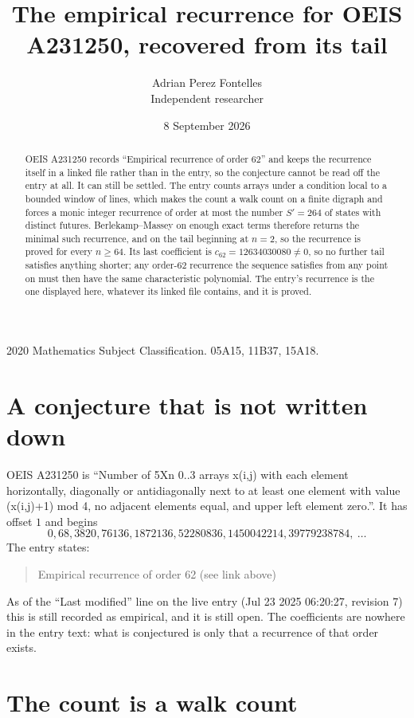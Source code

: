 \documentclass[11pt,a4paper]{article}
\title{The empirical recurrence for OEIS A231250, recovered from its tail}
\author{Adrian Perez Fontelles\\ \small Independent researcher}
\date{8 September 2026}
\theoremstyle{plain}
\theoremstyle{definition}
\begin{document}
\maketitle

\begin{abstract}
OEIS A231250 records ``Empirical recurrence of order $62$'' and keeps the recurrence itself in
a linked file rather than in the entry, so the conjecture cannot be read off the entry at all.
It can still be settled. The entry counts arrays under a condition local to a bounded window of
lines, which makes the count a walk count on a finite digraph and forces a monic integer
recurrence of order at most the number $S'=264$ of states with distinct futures. Berlekamp--Massey on
enough exact terms therefore returns the minimal such recurrence, and on the tail beginning at $n=2$, so the recurrence is proved for every $n\ge64$.
Its last coefficient is $c_{62}=12634030080\neq0$, so no further tail satisfies anything
shorter; any order-$62$ recurrence the sequence satisfies from any point on must then have
the same characteristic polynomial. The entry's recurrence is the one displayed here, whatever
its linked file contains, and it is proved.
\end{abstract}

\noindent\small 2020 Mathematics Subject Classification. 05A15, 11B37, 15A18.\normalsize

\section{A conjecture that is not written down}

OEIS A231250 is ``Number of 5Xn 0..3 arrays x(i,j) with each element horizontally, diagonally or antidiagonally next to at least one element with value (x(i,j)+1) mod 4, no adjacent elements equal, and upper left element zero.''. It has offset $1$ and begins
\[
0, 68, 3820, 76136, 1872136, 52280836, 1450042214, 39779238784,\ \dots
\]
The entry states:
\begin{quote}
Empirical recurrence of order 62 (see link above)
\end{quote}
As of the ``Last modified'' line on the live entry (Jul 23 2025 06:20:27, revision 7)
this is still recorded as empirical, and it is still open. The coefficients are nowhere in the
entry text: what is conjectured is only that a recurrence of that order exists.

\section{The count is a walk count}
\end{document}

